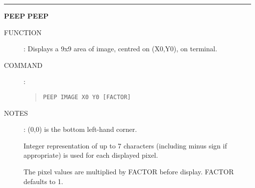 \goodbreak
\rule{\textwidth}{0.3mm}
{\Large {\bf PEEP} \hfill {\bf PEEP}}
\begin{description}
\item [FUNCTION]:
Displays a  9x9 area of image, centred on (X0,Y0), on terminal.
\item [COMMAND]:
\begin{quote}
{\tt PEEP  IMAGE  X0  Y0  [FACTOR]}
\end{quote}
\item [NOTES]:
(0,0) is the bottom left-hand corner.

Integer representation of up to 7 characters (including minus sign if
appropriate) is used for each displayed pixel.

The pixel values are multiplied by FACTOR before display.
FACTOR defaults to 1.
\end{description}

